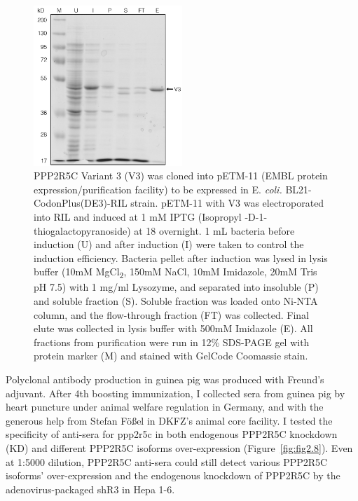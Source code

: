 \begin{figure} %
\centering
\includegraphics[width=0.5\textwidth]{figs/fig2-7 v3 purify.pdf}
\caption[Recombinant Variant 3 expression and purification]{\footnotesize PPP2R5C Variant 3 (V3) was cloned into pETM-11 (EMBL protein expression/purification facility) to be expressed in E. \textit{coli.} BL21-CodonPlus(DE3)-RIL strain. pETM-11 with V3 was electroporated into RIL and induced at 1 mM IPTG (Isopropyl \textbeta{}-D-1-thiogalactopyranoside) at 18 \celsius{} overnight. 1 mL bacteria before induction (U) and after induction (I) were taken to control the induction efficiency. Bacteria pellet after induction was lysed in lysis buffer (10mM MgCl\textsubscript{2}, 150mM NaCl, 10mM Imidazole, 20mM Tris pH 7.5) with 1 mg/ml Lysozyme, and separated into insoluble (P) and soluble fraction (S). Soluble fraction was loaded onto Ni-NTA column, and the flow-through fraction (FT) was collected. Final elute was collected in lysis buffer with 500mM Imidazole (E). All fractions from purification were run in 12\% SDS-PAGE gel with protein marker (M) and stained with GelCode Coomassie stain.}
\label{fig:fig2.7}
\end{figure}

Polyclonal antibody production in guinea pig was produced with Freund's adjuvant. After 4th boosting immunization, I collected sera from guinea pig by heart puncture under animal welfare regulation in Germany, and with the generous help from Stefan F\"o{\ss}el in DKFZ's animal core facility. I tested the specificity of anti-sera for \gls{ppp2r5c} in both endogenous PPP2R5C knockdown (KD) and different PPP2R5C isoforms over-expression (Figure~\ref{fig:fig2.8}). Even at 1:5000 dilution, PPP2R5C anti-sera could still detect various PPP2R5C isoforms' over-expression and the endogenous knockdown of PPP2R5C by the adenovirus-packaged shR3 in Hepa 1-6.

